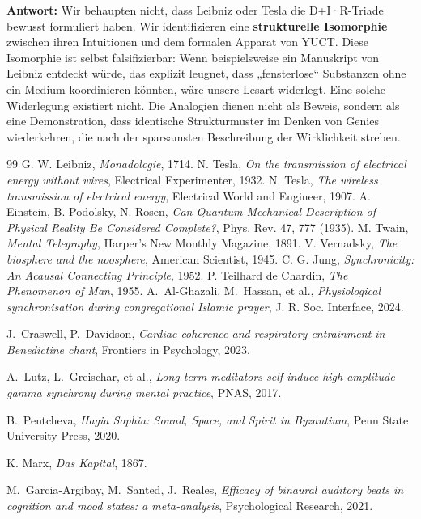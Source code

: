 \documentclass[12pt,a4paper]{article}
\begin{document}
\textbf{Antwort:} Wir behaupten nicht, dass Leibniz oder Tesla die D+I·R-Triade bewusst formuliert haben. Wir identifizieren eine \textbf{strukturelle Isomorphie} zwischen ihren Intuitionen und dem formalen Apparat von YUCT. Diese Isomorphie ist selbst falsifizierbar: Wenn beispielsweise ein Manuskript von Leibniz entdeckt würde, das explizit leugnet, dass „fensterlose“ Substanzen ohne ein Medium koordinieren könnten, wäre unsere Lesart widerlegt. Eine solche Widerlegung existiert nicht. Die Analogien dienen nicht als Beweis, sondern als eine Demonstration, dass identische Strukturmuster im Denken von Genies wiederkehren, die nach der sparsamsten Beschreibung der Wirklichkeit streben.

\begin{thebibliography}{99}
	 G. W. Leibniz, \emph{Monadologie}, 1714.
	 N. Tesla, \emph{On the transmission of electrical energy without wires}, Electrical Experimenter, 1932.
	 N. Tesla, \emph{The wireless transmission of electrical energy}, Electrical World and Engineer, 1907.
	 A. Einstein, B. Podolsky, N. Rosen, \emph{Can Quantum-Mechanical Description of Physical Reality Be Considered Complete?}, Phys. Rev. 47, 777 (1935).
	 M. Twain, \emph{Mental Telegraphy}, Harper's New Monthly Magazine, 1891.
	 V. Vernadsky, \emph{The biosphere and the noosphere}, American Scientist, 1945.
	 C. G. Jung, \emph{Synchronicity: An Acausal Connecting Principle}, 1952.
	 P. Teilhard de Chardin, \emph{The Phenomenon of Man}, 1955.
	A.~Al-Ghazali, M.~Hassan, et al., 
	\emph{Physiological synchronisation during congregational Islamic prayer}, 
	J. R. Soc. Interface, 2024.
	
	J.~Craswell, P.~Davidson, 
	\emph{Cardiac coherence and respiratory entrainment in Benedictine chant}, 
	Frontiers in Psychology, 2023.
	
	A.~Lutz, L.~Greischar, et al., 
	\emph{Long‑term meditators self‑induce high‑amplitude gamma synchrony during mental practice}, 
	PNAS, 2017.
	
	B.~Pentcheva, 
	\emph{Hagia Sophia: Sound, Space, and Spirit in Byzantium}, 
	Penn State University Press, 2020.
	
	 K. Marx, \emph{Das Kapital}, 1867.
	
	M.~Garcia‑Argibay, M.~Santed, J.~Reales, 
	\emph{Efficacy of binaural auditory beats in cognition and mood states: a meta‑analysis}, 
	Psychological Research, 2021.
\end{thebibliography}
\end{document}
